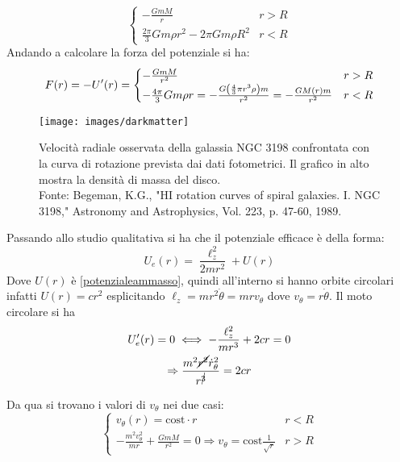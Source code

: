 \documentclass[Main.tex]{subfiles}
\begin{document}
\begin{tema}
\begin{equation}
\begin{cases}
 	- \frac{GmM}{r} \ \ &r>R\\
 	\frac{2 \pi}{3} Gm \rho r^2 - 2 \pi Gm \rho R^2 &r<R
 \end{cases}
\end{equation}
Andando a calcolare la forza del potenziale si ha:
\begin{equation} \notag
	F(r)= -U'(r)= \begin{cases}
 	- \frac{GmM}{r^2} \ \ &r>R\\
 	- \frac{4 \pi}{3} Gm \rho r = - \frac{G \left( \frac{4}{3}\pi r^3 \rho \right) m}{r^2}=-\frac{GM(r) m}{r^2} &r<R
 \end{cases}
\end{equation}
\begin{wrapfigure}{l}{0.35\textwidth}
	\texttt{[image: images/darkmatter]} \caption*{\scriptsize{Velocità radiale osservata della galassia NGC 3198 confrontata con la curva di rotazione prevista dai dati fotometrici. Il grafico in alto mostra la densità di massa del disco. \\ Fonte: Begeman, K.G., "HI rotation curves of spiral galaxies. I. NGC 3198," Astronomy and Astrophysics, Vol. 223, p. 47-60, 1989.}}\vspace{-1cm}
\end{wrapfigure}
Passando allo studio qualitativa si ha che il potenziale efficace è della forma:
\begin{equation}
	U_e(r) = \frac{\ell_z^2}{2mr^2} +U(r)
\end{equation}
Dove $U(r)$ è \eqref{potenzialeammasso}, quindi all'interno si hanno orbite circolari infatti $U(r)=cr^2$ esplicitando $\ell_z= mr^2 \dot \theta = m r v_\theta$ dove $v_\theta = r \dot \theta$. Il moto circolare si ha 
\begin{gather*}
	U'_e(r)=0 \iff - \frac{\ell_z^2}{mr^3} + 2cr = 0 \\ \Rightarrow \frac{m^2 \cancel{r^2} \dot r^2_\theta}{r^{\cancel{3}}}=2cr
\end{gather*}


\noindent Da qua si trovano i valori di $v_\theta$ nei due casi:
\begin{equation*}
	\begin{cases}
		v_\theta (r)= \text{cost} \cdot r \ \ & r<R\\
		- \frac{m^2 v_\theta^2}{mr} + \frac{GmM}{r^2}=0 \Rightarrow v_\theta =  \text{cost} \frac{1}{\sqrt{r}} &r>R
	\end{cases}
\end{equation*}


\end{tema}
\end{document}
